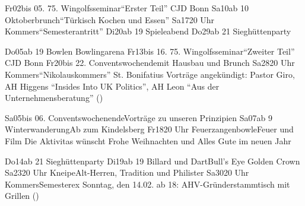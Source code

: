 \documentclass[10pt,a4paper, twoside]{book}
\begin{document}

	
	{ \neueVeranstaltung
	{Fr}{02}{bis 05.}
		{75. Wingolfsseminar}{\enquote{Erster Teil}}
		{CJD Bonn}{}}
	{\neueVeranstaltung
		{Sa}{10}{ab 10}
		{Oktoberbrunch}{\enquote{Türkisch Kochen und Essen}}
		{\adH}{}}
	{\neueVeranstaltung
		{Sa}{17}{20 Uhr}
		{Kommers}{\enquote{Semesterantritt}}
		{\adH}{}}
	{\neueVeranstaltung
		{Di}{20}{ab 19}
		{Spieleabend}{}
		{\adH}{}}
	{\neueVeranstaltung
		{Do}{29}{ab 21}
		{Sieghüttenparty}{}
		{\adH}{}}
	
	{\neueVeranstaltung
		{Do}{05}{ab 19}
		{Bowlen}{}
		{Bowlingarena}{}}
	{\neueVeranstaltung
		{Fr}{13}{bis 16.}
		{75. Wingolfsseminar}{\enquote{Zweiter Teil}}
		{CJD Bonn}{}}
	{\neueVeranstaltung
		{Fr}{20}{bis 22.}
		{Conventswochende}{mit Hausbau und Brunch}
		{\adH}{}}
	{\neueVeranstaltung
		{Sa}{28}{20 Uhr}
		{Kommers}{\enquote{Nikolauskommers}}
		{St. Bonifatius}{}}
	{\neueLeereVeranstaltung}
	{\neueAnkuendigung
		{Vorträge angekündigt:}
		{Pastor Giro, AH Higgens \enquote{Insides Into UK Politics}, AH Leon \enquote{Aus der Unternehmensberatung}}
		{(\adH)}
	}
	
	{\neueVeranstaltung
		{Sa}{05}{bis 06.}
		{Conventswochenende}{Vorträge zu unseren Prinzipien}
		{\adH}{}}
	{\neueVeranstaltung
		{Sa}{07}{ab 9}
		{Winterwanderung}{Ab zum Kindelsberg}
		{\adH}{}}
	{\neueVeranstaltung
		{Fr}{18}{20 Uhr}
		{Feuerzangenbowle}{Feuer und Film}
		{\adH}{}}
	{\neueLeereVeranstaltung}
	{\neueLeereVeranstaltung}
	{\neuerHinweis
		{Die Aktivitas wünscht}
		{Frohe Weihnachten und Alles Gute im neuen Jahr}
	}
	
	{\neueVeranstaltung
		{Do}{14}{ab 21}
		{Sieghüttenparty}{}
		{\adH}{}}
	{\neueVeranstaltung
		{Di}{19}{ab 19}
		{Billard und Dart}{Bull's Eye}
		{Golden Crown}{}}
	{\neueVeranstaltung
		{Sa}{23}{20 Uhr}
		{Kneipe}{Alt-Herren, Tradition und Philister}
		{\adH}{}}
	{\neueVeranstaltung
		{Sa}{30}{20 Uhr}
		{Kommers}{Semesterex}
		{\adH}{}}
	{\neueLeereVeranstaltung}
	{\neueAnkuendigung
		{Sonntag, den 14.02. ab 18:}
		{AHV-Gründerstammtisch mit Grillen}
		{(\adH)}
		}
\end{document}
